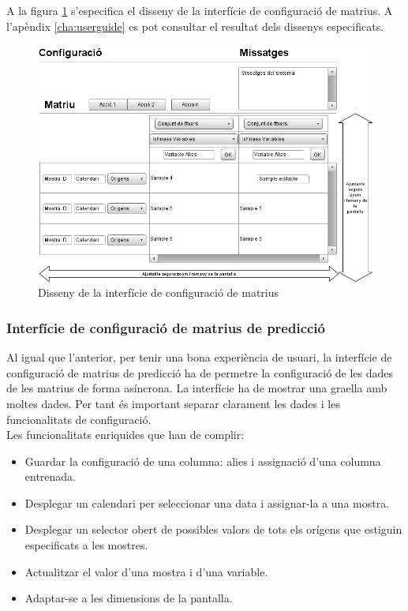 A la figura \ref{fig:interfacematrixconf} s'especifica el disseny de la interfície de configuraci\'{o} de matrius. A l'apèndix \ref{cha:userguide} es pot consultar el resultat dels dissenys especificats.

\begin{figure}[H]
  \centering
  \includegraphics[scale=0.5]{img/design/Interficiedeconfiguracio.png}
  \caption{Disseny de la interfície de configuració de matrius}
  \label{fig:interfacematrixconf}
\end{figure}


\subsubsection{Interf\'{i}cie de configuraci\'{o} de matrius de predicció}
Al igual que l'anterior, per tenir una bona experiència de usuari, la interfície de configuració de matrius de predicció ha de permetre la configuració de les dades de les matrius de forma asíncrona. La interfície ha de mostrar una graella amb moltes dades. Per tant \'{e}s important separar clarament les dades i les funcionalitats de configuració.\\

Les funcionalitats enriquides que han de complir:
\begin{itemize}
\item Guardar la configuració de una columna: alies i assignació d'una columna entrenada.
\item Desplegar un calendari per seleccionar una data i assignar-la a una mostra.
\item Desplegar un selector obert de possibles valors de tots els orígens que estiguin especificats a les mostres.
\item Actualitzar el valor d'una mostra i d'una variable.
\item Adaptar-se a les dimensions de la pantalla.
\end{itemize}

